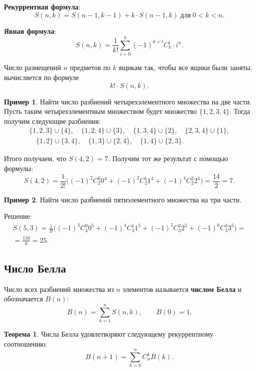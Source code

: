 \documentclass[a5paper, 11pt]{extarticle}
\theoremstyle{definition}
\newtheorem*{theorem*}{Теорема}
\newtheorem{example}{Пример}[subsection]
\theoremstyle{definition}
\theoremstyle{definition}
\numberwithin{figure}{section}
\numberwithin{table}{section}
\begin{document}
\textbf{Рекуррентная формула}:
\[
    S(n, k) = S(n - 1, k -1) + k \cdot S(n - 1, k) \; \text{для} \; 0 < k < n.
\]

\textbf{Явная формула}:
\[
    S(n, k) = \frac{1}{k!} \sum_{i = 0}^k (-1)^{k + i} C_k^i \cdot i^n.
\]

Число размещений \(n\) предметов по \(k\) ящикам так, чтобы все ящики были заняты, вычисляется по формуле
\[
    k! \cdot S(n, k).
\]

\begin{example}
    Найти число разбиений четырехэлементного множества на две части. Пусть таким четырехэлементным множеством будет множество \(\{1, 2, 3, 4\}\). Тогда получим следующие разбиения:
    \begin{gather*}
        \{1, 2, 3\} \cup \{4\},
        \quad
        \{1, 2, 4\} \cup \{3\},
        \quad
        \{1, 3, 4\} \cup \{2\},
        \quad
        \{2, 3, 4\} \cup \{1\}, \\
        \quad
        \{1, 2\} \cup \{3, 4\},
        \quad
        \{1, 3\} \cup \{2, 4\},
        \quad
        \{1, 4\} \cup \{2, 3\}.
    \end{gather*}

    Итого получаем, что \(S(4, 2) = 7\). Получим тот же результат с помощью формулы:
    \[
        S(4, 2) =
        \frac{1}{2!} \Big( (-1)^2 C_2^0 0^4 + (-1)^3 C_2^1 1^4 + (-1)^4 C_2^2 2^4 \Big) =
        \frac{14}{2} = 7.
    \]
\end{example}

\begin{example}
    Найти число разбиений пятиэлементного множества на три части.

    Решение:
    \begin{gather*}
        S(5, 3) = \frac{1}{3!} \Big( (-1)^3 C_3^0 0^5 + (-1)^4 C_3^1 1^5 + (-1)^5 C_3^2 2^5 + (-1)^6 C_3^3 3^5 \Big) = \\
        = \frac{150}{6} = 25.
    \end{gather*}
\end{example}

\subsection{Число Белла}

Число всех разбиений множества из \(n\) элементов называется \textbf{числом Белла} и обозначается \(B(n)\):
\[
    B(n) = \sum_{k = 1}^n S(n, k),
    \qquad
    B(0) = 1.
\]

\begin{theorem*}
    Числа Белла удовлетворяют следующему рекуррентному соотношению:
    \[
        B(n + 1) = \sum_{k = 0}^n C_n^k B(k).
    \]
\end{theorem*}
\end{document}
